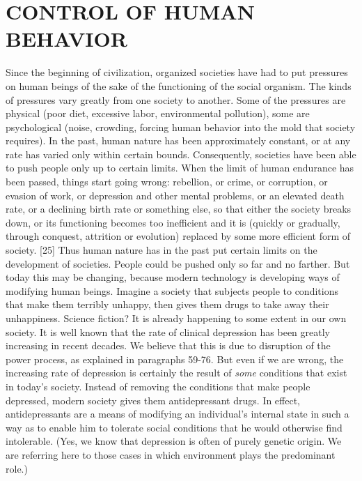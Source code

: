 \chapter{CONTROL OF HUMAN BEHAVIOR}

 Since the beginning of civilization, organized societies have had to put pressures on human beings of the sake of the functioning of the social organism. The kinds of pressures vary greatly from one society to another. Some of the pressures are physical (poor diet, excessive labor, environmental pollution), some are psychological (noise, crowding, forcing human behavior into the mold that society requires). In the past, human nature has been approximately constant, or at any rate has varied only within certain bounds. Consequently, societies have been able to push people only up to certain limits. When the limit of human endurance has been passed, things start going wrong: rebellion, or crime, or corruption, or evasion of work, or depression and other mental problems, or an elevated death rate, or a declining birth rate or something else, so that either the society breaks down, or its functioning becomes too inefficient and it is (quickly or gradually, through conquest, attrition or evolution) replaced by some more efficient form of society. [25]
 Thus human nature has in the past put certain limits on the development of societies. People could be pushed only so far and no farther. But today this may be changing, because modern technology is developing ways of modifying human beings.
 Imagine a society that subjects people to conditions that make them terribly unhappy, then gives them drugs to take away their unhappiness. Science fiction? It is already happening to some extent in our own society. It is well known that the rate of clinical depression has been greatly increasing in recent decades. We believe that this is due to disruption of the power process, as explained in paragraphs 59-76. But even if we are wrong, the increasing rate of depression is certainly the result of {\em some} conditions that exist in today’s society. Instead of removing the conditions that make people depressed, modern society gives them antidepressant drugs. In effect, antidepressants are a means of modifying an individual’s internal state in such a way as to enable him to tolerate social conditions that he would otherwise find intolerable. (Yes, we know that depression is often of purely genetic origin. We are referring here to those cases in which environment plays the predominant role.)
